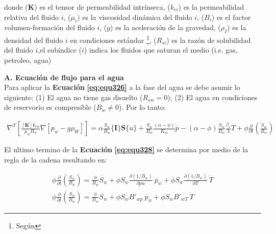 donde ($\mathbf{K}$) es el tensor de permeabilidad intrínseca, ($k_{ri}$) es la permeabilidad relativa del fluido $i$, ($\mu_i$) es la viscosidad dinámica del fluido $i$, ($B_i$) es el factor volumen-formación del fluido $i$, ($g$) es la aceleración de la gravedad, ($\rho_I$) es la densidad del fluido $i$ en condiciones estándar \footnote{Según}, ($R_{si}$) es la razón de solubilidad del fluido $i$,el subíndice ($i$) indica los fluidos que saturan el medio (i.e. gas, petroleo, agua)\bigskip

\textbf{A. Ecuación de flujo para el agua}
\\
Para aplicar la \textbf{Ecuación} \textbf{\ref{eq:equ326}} a la fase del agua se debe asumir lo siguiente: (1) El agua no tiene gas disuelto ($R_{sw} = 0$); (2) El agua en condiciones de reservorio es compresible ($B_{w} \neq 0$). Por lo tanto:\bigskip


\begin{ceqn} 
\label{eq:equ328} 
\begin{gather}
\nabla^T \left[ \frac{[\mathbf{K}] k_{rw}}{\mu_{w}B_{w}} \nabla[p_w - g\rho_{W}] \right] =
\alpha \frac{S_w}{B_w}\{\mathbf{I}\}\mathbf{S}\{\dot{u}\} + \frac{S_w}{B_w} \frac{(\alpha - \phi)}{K_m}\dot{\overline{p}} - (\alpha - \phi)\frac{S_w}{B_w}\frac{\beta_s}{3}\dot{T}
+ \phi \frac{\partial}{\partial t}\left(\frac{S_w}{B_w}\right)
\end{gather} 
\end{ceqn}

\bigskip
El ultimo termino de la \textbf{Ecuación} \textbf{\ref{eq:equ328}} se determina por medio de la regla de la cadena resultando en:


\begin{ceqn} 
\begin{subequations} \label{eq:equ329} 
\begin{gather}
\phi \frac{\partial}{\partial t}\left(\frac{S_w}{B_w}\right) = \frac{\phi}{B_w} \dot{S_w} + \phi S_w \frac{\partial (1/B_w) }{\partial pw}\ \dot{p_w}
+ \phi S_w \frac{\partial (1/B_w) }{\partial T}\ \dot{T}
\label{eq:equ329a} \\[10pt]
\phi \frac{\partial}{\partial t}\left(\frac{S_w}{B_w}\right) = \frac{\phi}{B_w} \dot{S_w} + \phi S_w B'_{wp} \ \dot{p_w}
+ \phi S_w B'_{wT} \ \dot{T}
\label{eq:equ329b}
\end{gather}
\end{subequations} 
\end{ceqn}

